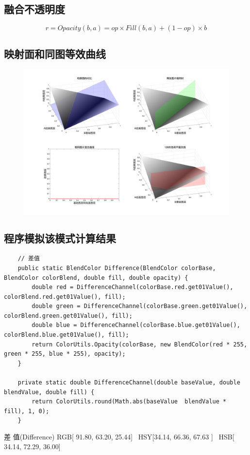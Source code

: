 \subsection{ 融合不透明度}
\begin{equation}r=Opacity(b,a)=op\times Fill(b,a)+(1-op)\times b\end{equation}
\subsection{ 映射面和同图等效曲线}
\begin{figure}[h!]
	\centering
	\includegraphics[width=0.9\linewidth]{figure/差值}
	\caption{}
	\label{fig:}
\end{figure}



\subsection{ 程序模拟该模式计算结果}

\begin{lstlisting}
	// 差值
	public static BlendColor Difference(BlendColor colorBase, BlendColor colorBlend, double fill, double opacity) {
		double red = DifferenceChannel(colorBase.red.get01Value(), colorBlend.red.get01Value(), fill);
		double green = DifferenceChannel(colorBase.green.get01Value(), colorBlend.green.get01Value(), fill);
		double blue = DifferenceChannel(colorBase.blue.get01Value(), colorBlend.blue.get01Value(), fill);
		return ColorUtils.Opacity(colorBase, new BlendColor(red * 255, green * 255, blue * 255), opacity);
	}
	
	private static double DifferenceChannel(double baseValue, double blendValue, double fill) {
		return ColorUtils.round(Math.abs(baseValue  blendValue * fill), 1, 0);
	}
\end{lstlisting}
\begin{result}
	\item 差    值(Difference)    RGB[ 91.80,  63.20,  25.44]~ HSY[34.14,  66.36,  67.63 ]~ HSB[ 34.14,  72.29,  36.00]
\end{result}
